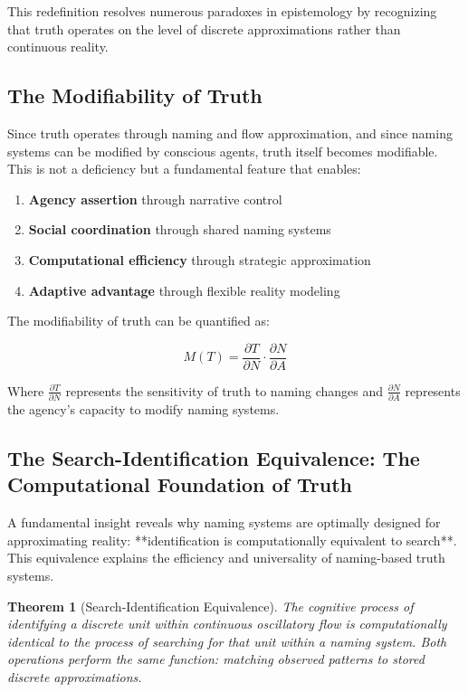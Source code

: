 \documentclass[12pt]{article}
\newtheorem{theorem}{Theorem}
\begin{document}
This redefinition resolves numerous paradoxes in epistemology by recognizing that truth operates on the level of discrete approximations rather than continuous reality.

\subsection{The Modifiability of Truth}

Since truth operates through naming and flow approximation, and since naming systems can be modified by conscious agents, truth itself becomes modifiable. This is not a deficiency but a fundamental feature that enables:

\begin{enumerate}
\item \textbf{Agency assertion} through narrative control
\item \textbf{Social coordination} through shared naming systems
\item \textbf{Computational efficiency} through strategic approximation
\item \textbf{Adaptive advantage} through flexible reality modeling
\end{enumerate}

The modifiability of truth can be quantified as:

$$M(T) = \frac{\partial T}{\partial N} \cdot \frac{\partial N}{\partial A}$$

Where $\frac{\partial T}{\partial N}$ represents the sensitivity of truth to naming changes and $\frac{\partial N}{\partial A}$ represents the agency's capacity to modify naming systems.

\subsection{The Search-Identification Equivalence: The Computational Foundation of Truth}

A fundamental insight reveals why naming systems are optimally designed for approximating reality: **identification is computationally equivalent to search**. This equivalence explains the efficiency and universality of naming-based truth systems.

\begin{theorem}[Search-Identification Equivalence]
The cognitive process of identifying a discrete unit within continuous oscillatory flow is computationally identical to the process of searching for that unit within a naming system. Both operations perform the same function: matching observed patterns to stored discrete approximations.
\end{theorem}
\end{document}
